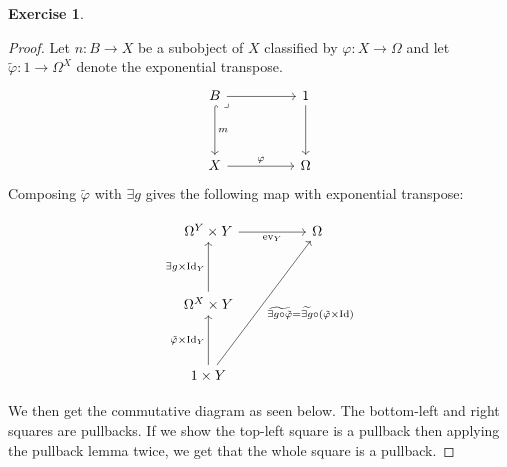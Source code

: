 \documentclass{article}
\DeclareMathOperator{\Id}{Id}
\DeclareMathOperator{\ev}{ev}
\theoremstyle{definition}
\newtheorem{question}{Exercise}
\begin{document}
\begin{question}
\begin{enumerate}[a)]
\begin{proof}
                  Let \(n:B\to X\) be a subobject of \(X\) classified by
                  \(\varphi:X\to\Omega\) and let
                  \(\tilde{\varphi}:1\to\Omega^{X}\) denote the exponential
                  transpose.
                  \begin{equation}
                      \begin{tikzcd}[ampersand replacement=\&]
                          B \&\& 1 \\
                          \\
                          X \&\& \Omega
                          \arrow["m", hook, from=1-1, to=3-1]
                          \arrow[from=1-1, to=1-3]
                          \arrow[from=1-3, to=3-3]
                          \arrow["\varphi", from=3-1, to=3-3]
                          \arrow["\lrcorner"{anchor=center, pos=0}, draw=none, from=1-1, to=3-3]
                      \end{tikzcd}
                  \end{equation}
                  Composing \(\tilde{\varphi}\) with \(\exists g\) gives the
                  following map with exponential transpose:

                  \begin{equation}
                      \begin{tikzcd}[ampersand replacement=\&]
                          {\Omega^{Y}\times Y} \&\& \Omega \\
                          \\
                          {\Omega^{X}\times Y} \\
                          \\
                          {1\times Y}
                          \arrow["{\tilde{\varphi}\times\Id_{Y}}", from=5-1, to=3-1]
                          \arrow["{\exists g\times\Id_{Y}}", from=3-1, to=1-1]
                          \arrow["{\ev_{Y}}"', from=1-1, to=1-3]
                          \arrow["{\widetilde{\exists g\circ\tilde{\varphi}}=\widetilde{\exists g}\circ (\tilde{\varphi}\times\Id)}"', from=5-1, to=1-3]
                      \end{tikzcd}
                      \label{fig:exp-transpose}
                  \end{equation}

                  We then get the commutative diagram as seen below. The
                  bottom-left and right squares are pullbacks. If we show the
                  top-left square is a pullback then applying the pullback lemma
                  twice, we get that the whole square is a pullback.


\end{proof}
\end{enumerate}
\end{question}
\end{document}
